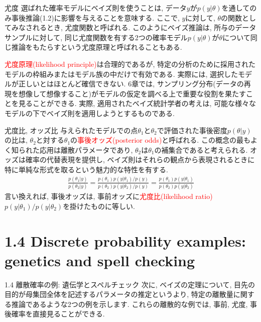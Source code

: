 \documentclass[10pt,dvipdfmx,a4]{beamer}
\newcommand{\eq}[1]{\begin{align}#1\end{align}}
\newcommand{\tcr}[1]{\textcolor{red}{#1}}
\begin{document}
\begin{frame}{尤度}
選ばれた確率モデルにベイズ則を使うことは, データ$y$が$p(y|\theta)$を通してのみ事後推論(1.2)に影響を与えることを意味する.
ここで, $y$に対して, $\theta$の関数としてみなされるとき, 尤度関数と呼ばれる.
このようにベイズ推論は, 所与のデータサンプルに対して, 同じ尤度関数を有する2つの確率モデル$p(y|\theta)$が$\theta$について同じ推論をもたらすという尤度原理と呼ばれることもある.

\tcr{尤度原理(likelihood principle)}は合理的であるが, 特定の分析のために採用されたモデルの枠組みまたはモデル族の中だけで有効である.
実際には, 選択したモデルが正しいとはほとんど確信できない.
6章では, サンプリング分布(データの再現を想像して想像すること)がモデルの仮定を調べる上で重要な役割を果たすことを見ることができる.
実際, 適用されたベイズ統計学者の考えは, 可能な様々なモデルの下でベイズ則を適用しようとするものである.
\end{frame}


\begin{frame}{尤度比, オッズ比}
与えられたモデルでの点$\theta_1$と$\theta_2$で評価された事後密度$p(\theta|y)$の比は, $\theta_2$と対する$\theta_1$の\tcr{事後オッズ(posterior odds)}と呼ばれる.
この概念の最もよく知られた応用は離散パラメータであり, $\theta_2$は$\theta_1$の補集合であると考えられる.
オッズは確率の代替表現を提供し, ベイズ則はそれらの観点から表現されるときに特に単純な形式を取るという魅力的な特性を有する.
\eq{\frac{p(\theta_1|y)}{p(\theta_2|y)}=\frac{p(\theta_1)p(y|\theta_1)/p(y)}{p(\theta_2)p(y|\theta_2)/p(y)}=\frac{p(\theta_1)p(y|\theta_1)}{p(\theta_2)p(y|\theta_2)}}
言い換えれば, 事後オッズは, 事前オッズに\tcr{尤度比(likelihood ratio)}$p(y|\theta_1)/p(y|\theta_2)$を掛けたものに等しい.
\end{frame}

\section{1.4 Discrete probability examples: genetics and spell checking}
\begin{frame}{1.4 離散確率の例: 遺伝学とスペルチェック}
次に, ベイズの定理について, 目先の目的が母集団全体を記述するパラメータの推定というより, 特定の離散量に関する推論であるような2つの例を示します.
これらの離散的な例では, 事前, 尤度, 事後確率を直接見ることができる.
\end{frame}
\end{document}
